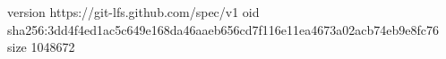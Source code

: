 version https://git-lfs.github.com/spec/v1
oid sha256:3dd4f4ed1ac5c649e168da46aaeb656cd7f116e11ea4673a02acb74eb9e8fc76
size 1048672
